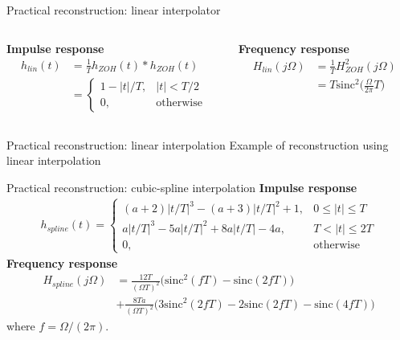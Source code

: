 \documentclass[10pt]{beamer}
\begin{document}
\begin{frame}{Practical reconstruction: linear interpolator}
	\begin{columns}[t]
		\begin{column}{0.5\textwidth}
			\textbf{Impulse response}
			\begin{align*}
			h_{lin}(t) &= \frac{1}{T}h_{ZOH}(t)\ast h_{ZOH}(t) \\
			&= \begin{cases}
			1-|t|/T, & |t| < T/2 \\
			0, & \text{otherwise}
			\end{cases} 
			\end{align*}
		\end{column}
		\begin{column}{0.5\textwidth}
			\textbf{Frequency response}
			\begin{align*}
			H_{lin}(j\Omega) &= \frac{1}{T}H^2_{ZOH}(j\Omega) \\
			&= T\mathrm{sinc}^2\Big(\frac{\Omega}{2\pi} T\Big)
			\end{align*}
		\end{column}
	\end{columns}
	\begin{center}
		\resizebox{\linewidth}{!}{}
	\end{center}
\end{frame}

\begin{frame}{Practical reconstruction: linear interpolation}
	Example of reconstruction using linear interpolation
	\begin{center}
		\resizebox{0.7\linewidth}{!}{}
	\end{center}
\end{frame}

\begin{frame}{Practical reconstruction: cubic-spline interpolation}
\textbf{Impulse response}
\begin{align*}
	h_{spline}(t) = \begin{cases}
	(a+2)|t/T|^3 - (a+3)|t/T|^2 + 1, & 0 \leq |t| \leq T \\
	a|t/T|^3 - 5a|t/T|^2 + 8a|t/T|-4a, & T < |t| \leq 2T \\
	0, & \text{otherwise}
	\end{cases} 
\end{align*}
\textbf{Frequency response}
\begin{align*}
	H_{spline}(j\Omega) &= \frac{12T}{(\Omega T)^2}\Big(\mathrm{sinc}^2(fT)-\mathrm{sinc}(2fT)\Big) \\
	&+ \frac{8Ta}{(\Omega T)^2}\Big(3\mathrm{sinc}^2(2fT) - 2\mathrm{sinc}(2fT) - \mathrm{sinc}(4fT)\Big)
\end{align*}
where $f = \Omega/(2\pi)$.
\end{frame}
\end{document}
